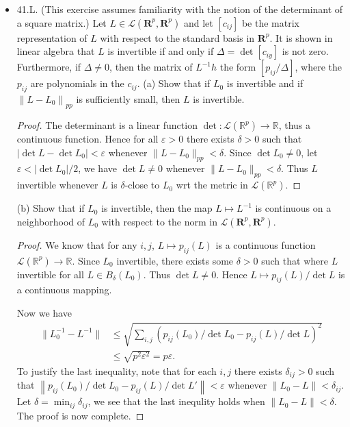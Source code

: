 \begin{itemize}
\item 41.L. (This exercise assumes familiarity with the notion of the determinant of a square matrix.) Let $L \in \mathscr{L}\left(\mathbf{R}^p, \mathbf{R}^p\right)$ and let $\left[c_{i j}\right]$ be the matrix representation of $L$ with respect to the standard basis in $\boldsymbol{R}^p$. It is shown in linear algebra that $L$ is invertible if and only if $\Delta=\operatorname{det}\left[c_{i y}\right]$ is not zero. Furthermore, if $\Delta \neq 0$, then the matrix of $L^{-1} h$ the form $\left[p_{i j} / \Delta\right]$, where the $p_{i j}$ are polynomials in the $c_{i j}$.
(a) Show that if $L_0$ is invertible and if $\left\|L-L_0\right\|_{p p}$ is sufficiently small, then $L$ is invertible.
\begin{proof}
	The determinant is a linear function $\operatorname{det}: \mathcal{L}(\mathbb{R}^p) \to  \mathbb{R}$, thus a continuous function. Hence for all $\varepsilon>0$ there exists $\delta>0$ such that $|\operatorname{det} L - \operatorname{det}L_0| < \varepsilon $ whenever $\|L - L_0\|_{pp}<\delta$. 
	Since  $\operatorname{det} L_0 \neq 0$, let $\varepsilon < |\operatorname{det}L_0| / 2$, we have $\operatorname{det}L \neq 0$ whenever $\|L - L_0\|_{pp}<\delta$. Thus $L$ invertible whenever $L$ is $\delta$-close to $L_0$ wrt the metric in $\mathcal{L}(\mathbb{R}^p)$.
\end{proof}

(b) Show that if $L_0$ is invertible, then the map $L \mapsto L^{-1}$ is continuous on a neighborhood of $L_0$ with respect to the norm in $\mathscr{L}\left(\boldsymbol{R}^p, \mathbf{R}^p\right)$.
\begin{proof}
	We know that for any $i, j$, $L \mapsto p_{ij}(L)$ is a continuous function $\mathcal{L}(\mathbb{R}^p) \to \mathbb{R}$. Since $L_0$ invertible, there exists some $\delta>0$ such that  where $L$ invertible for all $L \in B_\delta(L_0)$. Thus $\operatorname{det} L \neq 0$. Hence $L \mapsto p_{ij}(L) / \operatorname{det} L$ is a continuous mapping.

	Now we have
	\begin{align*}
		\|L_0^{-1} - L^{-1}\|
		&\le  \sqrt{\sum_{i,j} \left( p_{ij}(L_0) / \operatorname{det}L_0 - p_{ij}(L) / \operatorname{det} L \right)^2 } \\
		&\le \sqrt{p^2 \varepsilon^2} = p \varepsilon 
	.\end{align*}
	To justify the last inequality, note that for each $i,j$ there exists $\delta_{ij} >0$ such that $\left\| p_{ij}(L_0) / \operatorname{det}L_0 - p_{ij}(L) / \operatorname{det} L' \right\| < \varepsilon$ whenever $\|L_0 - L\|< \delta_{ij}$. Let $\delta = \min_{ij} \delta_{ij}$, we see that the last inequlity holds when $\|L_0 - L\|<\delta$. The proof is now complete.
\end{proof}


\end{itemize}
